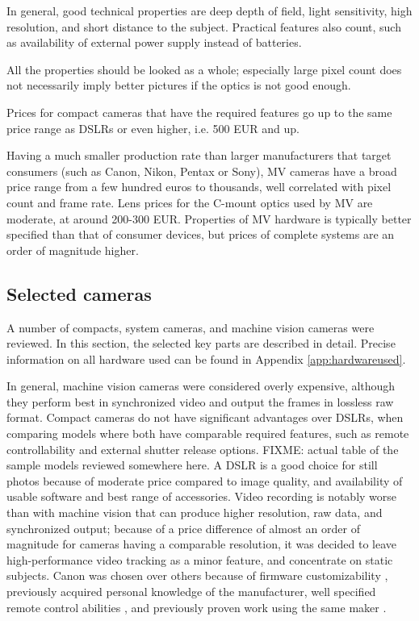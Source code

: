 In general, good technical properties are deep depth of field, light sensitivity, high resolution, and short distance to the subject.
Practical features also count, such as availability of external power supply instead of batteries.

All the properties should be looked as a whole; especially large pixel count does not necessarily imply better pictures if the optics is not good enough.

Prices for compact cameras that have the required features go up to the same price range as DSLRs or even higher, i.e. 500 EUR and up.

Having a much smaller production rate than larger manufacturers that target consumers (such as Canon, Nikon, Pentax or Sony), MV cameras have a broad price range from a few hundred euros to thousands, well correlated with pixel count and frame rate.
Lens prices for the C-mount optics used by MV are moderate, at around 200-300 EUR.
Properties of MV hardware is typically better specified than that of consumer devices, but prices of complete systems are an order of magnitude higher.



\subsection{Selected cameras} %

A number of compacts, system cameras, and machine vision cameras were reviewed.
In this section, the selected key parts are described in detail.
Precise information on all hardware used can be found in Appendix \ref{app:hardwareused}.

In general, machine vision cameras were considered overly expensive, although they perform best in synchronized video and output the frames in lossless raw format.
Compact cameras do not have significant advantages over DSLRs, when comparing models where both have comparable required features, such as remote controllability and external shutter release options.
{ \color{red} FIXME: actual table of the sample models reviewed somewhere here. }
A DSLR is a good choice for still photos because of moderate price compared to image quality, and availability of usable software and best range of accessories.
Video recording is notably worse than with machine vision that can produce higher resolution, raw data, and synchronized output;
because of a price difference of almost an order of magnitude for cameras having a comparable resolution, it was decided to leave high-performance video tracking as a minor feature, and concentrate on static subjects.
Canon was chosen over others because of firmware customizability \cite{magiclantern}, previously acquired personal knowledge of the manufacturer, well specified remote control abilities \cite{canonedsdk}, and previously proven work using the same maker \cite{ir-ltd,ten24,capturelab,agisoftforum}.


